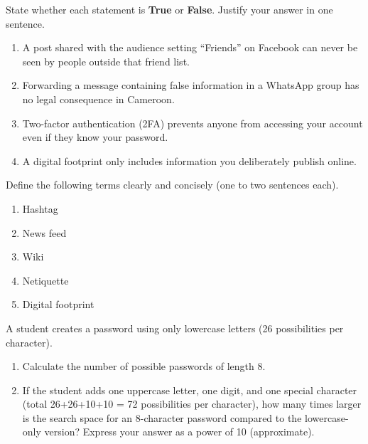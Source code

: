 \documentclass[11pt]{article}
\newcounter{popsec}
\newcounter{popsub}
\newcommand{\courssub}[1]{%
  \stepcounter{popsub}%
  \par\vspace{9pt}\noindent{\popxbold\fontsize{11.5}{13}\selectfont\color{popink}{\color{poporange}\thepopsec.\thepopsub}\hspace{6pt}#1}\par\nopagebreak\vspace{4pt}
}
\begin{document}
\begin{exercice}
State whether each statement is \textbf{True} or \textbf{False}. Justify your answer in one sentence.
\begin{enumerate}
    \item A post shared with the audience setting ``Friends'' on Facebook can never be seen by people outside that friend list.
    \item Forwarding a message containing false information in a WhatsApp group has no legal consequence in Cameroon.
    \item Two-factor authentication (2FA) prevents anyone from accessing your account even if they know your password.
    \item A digital footprint only includes information you deliberately publish online.
\end{enumerate}
\end{exercice}

\begin{exercice}[Definitions]
Define the following terms clearly and concisely (one to two sentences each).
\begin{enumerate}
    \item Hashtag
    \item News feed
    \item Wiki
    \item Netiquette
    \item Digital footprint
\end{enumerate}
\end{exercice}

\begin{exercice}
A student creates a password using only lowercase letters (26 possibilities per character).
\begin{enumerate}
    \item Calculate the number of possible passwords of length 8.
    \item If the student adds one uppercase letter, one digit, and one special character (total 26+26+10+10 = 72 possibilities per character), how many times larger is the search space for an 8-character password compared to the lowercase-only version? Express your answer as a power of 10 (approximate).
\end{enumerate}
\end{exercice}

\courssub{I practise}
\end{document}
